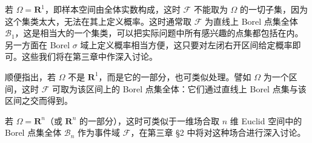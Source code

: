 \documentclass[../../main.tex]{subfiles}
\begin{document}
\begin{example}[实数上的概率空间]\label{example:ch01-实数概率空间}
若 $\Omega=\mathbf{R}^1$，即样本空间由全体实数构成，这时 $\mathscr{F}$ 不能取为 $\Omega$ 的一切子集，因为这个集类太大，无法在其上定义概率。这时通常取 $\mathscr{F}$ 为直线上 Borel 点集全体 $\mathscr{B}_1$，这是相当大的一个集类，可以把实际问题中所有感兴趣的点集都包括在内。另一方面在 Borel $\sigma$ 域上定义概率相当方便，这只要对左闭右开区间给定概率即可。这些我们将在第三章中作深入讨论。
\end{example}

顺便指出，若 $\Omega$ 不是 $\mathbf{R}^1$，而是它的一部分，也可类似处理。譬如 $\Omega$ 为一个区间，这时 $\mathscr{F}$ 可取为该区间上的 Borel 点集全体：它们通过直线上 Borel 点集与该区间之交而得到。

\begin{example}[高维概率空间]\label{example:ch01-高维概率空间}
若 $\Omega=\mathbf{R}^n$（或 $\mathbf{R}^n$ 的一部分），这时可类似于一维场合取 $n$ 维 Euclid 空间中的 Borel 点集全体 $\mathscr{B}_n$ 作为事件域 $\mathscr{F}$，在第三章 \S 2 中将对这种场合进行深入讨论。
\end{example}
\end{document}
